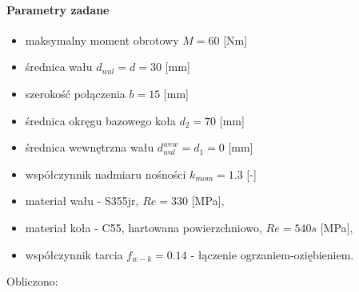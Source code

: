 		\paragraph{Parametry zadane}
		\begin{itemize}
			\item maksymalny moment obrotowy $M = 60$ [Nm]
			\item średnica wału $d_{wal} = d = 30$ [mm]
			\item szerokość połączenia $b = 15$ [mm]
			\item średnica okręgu bazowego koła $d_2 = 70$ [mm]
			\item średnica wewnętrzna wału $d_{wal}^{wew} = d_1 = 0$ [mm]
			\item współczynnik nadmiaru nośności $k_{mom} = 1.3$ [-]
			\item materiał wału - S355jr, $Re = 330$ [MPa],
			\item materiał koła - C55, hartowana powierzchniowo, $Re = 540s$ [MPa],
			\item współczynnik tarcia $f_{w-k} = 0.14$ - łączenie ogrzaniem-oziębieniem.
		\end{itemize}
		Obliczono:
